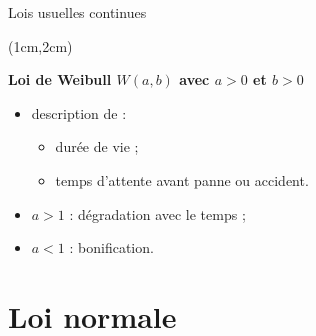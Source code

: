 \documentclass{beamer}
\begin{document}
\begin{frame}{Lois usuelles continues}
\begin{textblock*}{\textwidth}(1cm,2cm)

\begin{center}{\bf \Large Loi de Weibull $W(a,b)$ avec $a>0$ et $b>0$} \end{center}


\begin{itemize}
\item 
 description de : 
 \begin{itemize}
\item durée de vie ;
\item temps d'attente avant panne ou accident.
\end{itemize}
\item  $a>1$ :  dégradation avec le temps ;
\item  $a<1$ :  bonification.

\end{itemize}


 


\end{textblock*}

\end{frame}


\section{Loi normale}
\end{document}
